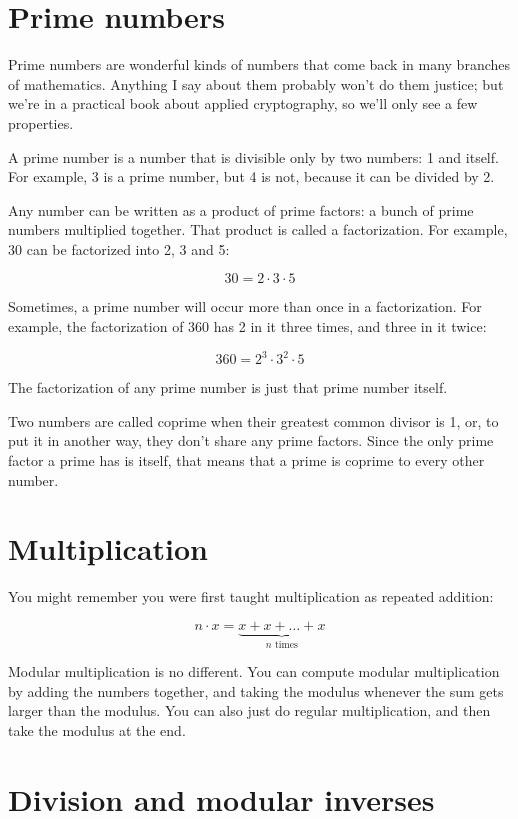 \documentclass[11pt,ebook,table,dvipsnames]{memoir}
\begin{document}
\section{Prime numbers}
\label{sec-4-1-2}

Prime numbers are wonderful kinds of numbers that come back in many
branches of mathematics. Anything I say about them probably won't do
them justice; but we're in a practical book about applied
cryptography, so we'll only see a few properties.

A prime number is a number that is divisible only by two numbers: 1
and itself. For example, 3 is a prime number, but 4 is not, because it
can be divided by 2.

Any number can be written as a product of prime factors: a bunch of
prime numbers multiplied together. That product is called a
factorization. For example, 30 can be factorized into 2, 3 and 5:

\[
30 = 2 \cdot 3 \cdot 5
\]

Sometimes, a prime number will occur more than once in a
factorization. For example, the factorization of 360 has 2 in it
three times, and three in it twice:

\[
360 = 2^3 \cdot 3^2 \cdot 5
\]

The factorization of any prime number is just that prime number itself.

Two numbers are called coprime when their greatest common divisor is
1, or, to put it in another way, they don't share any prime factors.
Since the only prime factor a prime has is itself, that means that a
prime is coprime to every other number.
\section{Multiplication}
\label{sec-4-1-3}

You might remember you were first taught multiplication as repeated
addition:

\[
n \cdot x = \underbrace{x + x + \ldots + x}_{n \text{ times}}
\]

Modular multiplication is no different. You can compute modular
multiplication by adding the numbers together, and taking the modulus
whenever the sum gets larger than the modulus. You can also just do
regular multiplication, and then take the modulus at the end.
\section{Division and modular inverses}
\label{sec-4-1-4}
\end{document}
